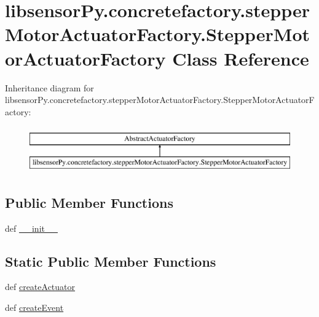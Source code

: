 \hypertarget{classlibsensorPy_1_1concretefactory_1_1stepperMotorActuatorFactory_1_1StepperMotorActuatorFactory}{}\section{libsensor\+Py.\+concretefactory.\+stepper\+Motor\+Actuator\+Factory.\+Stepper\+Motor\+Actuator\+Factory Class Reference}
\label{classlibsensorPy_1_1concretefactory_1_1stepperMotorActuatorFactory_1_1StepperMotorActuatorFactory}
Inheritance diagram for libsensor\+Py.\+concretefactory.\+stepper\+Motor\+Actuator\+Factory.\+Stepper\+Motor\+Actuator\+Factory\+:\begin{figure}[H]
\begin{center}
\leavevmode
\includegraphics[height=2.000000cm]{classlibsensorPy_1_1concretefactory_1_1stepperMotorActuatorFactory_1_1StepperMotorActuatorFactory}
\end{center}
\end{figure}
\subsection*{Public Member Functions}
\begin{DoxyCompactItemize}
\item 
def \hyperlink{classlibsensorPy_1_1concretefactory_1_1stepperMotorActuatorFactory_1_1StepperMotorActuatorFactory_a4afe4f80ff735a01e15b7e4e41396875}{\+\_\+\+\_\+init\+\_\+\+\_\+}
\end{DoxyCompactItemize}
\subsection*{Static Public Member Functions}
\begin{DoxyCompactItemize}
\item 
def \hyperlink{classlibsensorPy_1_1concretefactory_1_1stepperMotorActuatorFactory_1_1StepperMotorActuatorFactory_a55ebf9331bcb3127fd450cb06d2ea9b2}{create\+Actuator}
\item 
def \hyperlink{classlibsensorPy_1_1concretefactory_1_1stepperMotorActuatorFactory_1_1StepperMotorActuatorFactory_a2ba613d30b96f01ac0685cd2eed3af9b}{create\+Event}
\end{DoxyCompactItemize}


